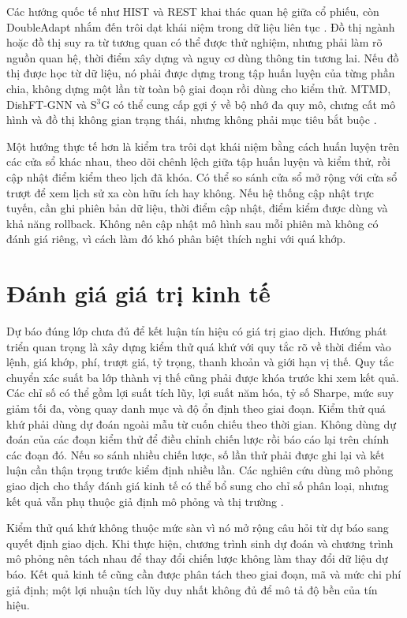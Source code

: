 Các hướng quốc tế như HIST và REST khai thác quan hệ giữa cổ phiếu, còn DoubleAdapt
nhắm đến trôi dạt khái niệm trong dữ liệu liên tục \cite{Xu2021_211013716v2,
Xu2021_210207372v2,Zhao2023_230609862v3}. Đồ thị ngành hoặc đồ thị suy ra từ tương
quan có thể được thử nghiệm, nhưng phải làm rõ nguồn quan hệ, thời điểm xây dựng và
nguy cơ dùng thông tin tương lai. Nếu đồ thị được học từ dữ liệu, nó phải được dựng
trong tập huấn luyện của từng phần chia, không dựng một lần từ toàn bộ giai đoạn rồi dùng cho kiểm thử.
MTMD, DishFT-GNN và S$^{3}$G có thể cung cấp gợi ý về bộ nhớ đa quy mô, chưng cất mô hình
và đồ thị không gian trạng thái, nhưng không phải mục tiêu bắt buộc
\cite{Wang2022_221208656v2,Liu2025_250210776v1,Lu2026_260324236v1}.

Một hướng thực tế hơn là kiểm tra trôi dạt khái niệm bằng cách huấn luyện trên các cửa sổ
khác nhau, theo dõi chênh lệch giữa tập huấn luyện và kiểm thử, rồi cập nhật điểm kiểm theo lịch đã
khóa. Có thể so sánh cửa sổ mở rộng với cửa sổ trượt để xem lịch sử xa còn hữu ích hay
không. Nếu hệ thống cập nhật trực tuyến, cần ghi phiên bản dữ liệu, thời điểm cập nhật,
điểm kiểm được dùng và khả năng rollback. Không nên cập nhật mô hình sau mỗi phiên mà
không có đánh giá riêng, vì cách làm đó khó phân biệt thích nghi với quá khớp.

\section{Đánh giá giá trị kinh tế}

Dự báo đúng lớp chưa đủ để kết luận tín hiệu có giá trị giao dịch. Hướng phát triển
quan trọng là xây dựng kiểm thử quá khứ với quy tắc rõ về thời điểm vào lệnh, giá khớp, phí,
trượt giá, tỷ trọng, thanh khoản và giới hạn vị thế. Quy tắc chuyển xác suất ba lớp
thành vị thế cũng phải được khóa trước khi xem kết quả. Các chỉ số có thể gồm lợi suất tích lũy,
lợi suất năm hóa, tỷ số Sharpe, mức suy giảm tối đa, vòng quay danh mục và độ ổn định theo
giai đoạn.
Kiểm thử quá khứ phải dùng dự đoán ngoài mẫu từ cuốn chiếu theo thời gian. Không dùng dự
đoán của các đoạn kiểm thử để điều chỉnh chiến lược rồi báo cáo lại trên chính các đoạn đó.
Nếu so sánh nhiều chiến lược, số lần thử phải được ghi lại và kết luận cần thận trọng trước
kiểm định nhiều lần. Các nghiên cứu dùng mô phỏng giao dịch cho thấy đánh giá kinh tế có
thể bổ sung cho chỉ số phân loại, nhưng kết quả vẫn phụ thuộc giả định mô phỏng và thị
trường \cite{Chen2021_210708721v1,Feng2018_181009936v2}.

Kiểm thử quá khứ không thuộc mức sàn vì nó mở rộng câu hỏi từ dự báo sang quyết định giao dịch.
Khi thực hiện, chương trình sinh dự đoán và chương trình mô phỏng nên tách nhau để thay
đổi chiến lược không làm thay đổi dữ liệu dự báo. Kết quả kinh tế cũng cần được phân
tách theo giai đoạn, mã và mức chi phí giả định; một lợi nhuận tích lũy duy nhất không
đủ để mô tả độ bền của tín hiệu.

